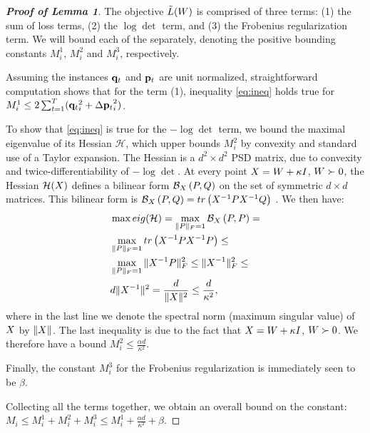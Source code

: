 \documentclass{article}
\begin{document}
\begin{proof}[\bf{Proof of Lemma 1}]
The objective $\tilde{L}({W})$ is comprised of three terms: (1) the sum of loss terms, (2) the $\log \det$ term, and (3) the Frobenius regularization term. We will bound each of the separately, denoting the positive bounding constants $M^1_i$, $M^2_i$ and $M^3_i$, respectively. 

Assuming the instances ${{\mathbf{q}}_{{t}}}$ and ${{\mathbf{p}}_{{t}}}$ are unit normalized, straightforward computation shows that for the term (1), inequality \ref{eq:ineq} holds true for $M^1_i \leq 2 \sum_{t=1}^T ({{\mathbf{q}}_{{t}}}_i^2 +{\Delta\mathbf{p}_{t}}_i^2)$. %

To show that \ref{eq:ineq} is true for the $- \log \det$ term, we bound the maximal eigenvalue of its Hessian $\mathcal{H}$, which upper bounds $M_i^2$ by convexity and standard use of a Taylor expansion.
The Hessian is a $d^2 \times d^2$ PSD matrix, due to convexity and twice-differentiability of $- \log \det$. At every point ${X} = {W} + \kappa I$, ${W} \succ 0$, the Hessian $\mathcal{H}({X})$ defines a bilinear form $\mathcal{B}_{{X}}\left({P},{Q}\right)$ on the set of symmetric $d \times d$ matrices. This bilinear form is $\mathcal{B}_{{X}}\left({P},{Q}\right) = tr\left({X}^{-1}{P} {X}^{-1}{Q}\right)$ \citep[Appendix A]{boyd2004convex}. We then have:
\begin{align*}
&\max eig(\mathcal{H}) = \max_{\|{P}\|_F=1} \mathcal{B}_{{X}}\left({P},{P}\right) = \\
&\max_{\|{P}\|_F=1} tr\left({X}^{-1}{P} {X}^{-1}{P}\right) \leq \\
&\max_{\|{P}\|_F=1} \|{X}^{-1} {P}\|_F^2 \leq \|{X}^{-1}\|_F^2 \leq  \\
& d \|{X}^{-1}\|^2 = \frac{d}{\|{X}\|^2} \leq \frac{d}{\kappa^2},
\end{align*}
where in the last line we denote the spectral norm (maximum singular value) of ${X}$ by $\|{X}\|$. The last inequality is due to the fact that ${X} = {W} + \kappa I$, ${W} \succ 0$.
We therefore have a bound $M^2_i \leq \frac{\alpha d}{\kappa^2}$.

Finally, the constant $M^3_{i}$ for the Frobenius regularization is immediately seen to be $\beta$.

Collecting all the terms together, we obtain an overall bound on the constant: $M_i \leq M^1_{i} + M^2_{i} + M^3_{i} \leq  M^1_{i} + \frac{\alpha d}{\kappa ^2} + \beta$.
\end{proof}
\end{document}
